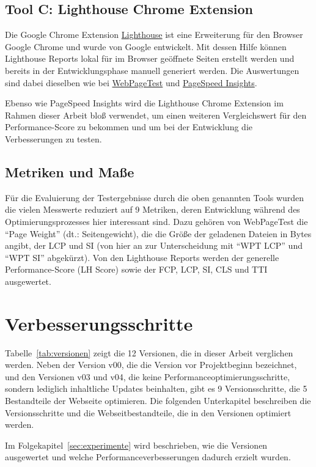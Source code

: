 \documentclass[11pt,a4paper]{article}
\begin{document}
\subsection{Tool C: Lighthouse Chrome Extension}\label{subsec:Lighthouse}
Die Google Chrome Extension \href{https://chromewebstore.google.com/detail/lighthouse/blipmdconlkpinefehnmjammfjpmpbjk}{Lighthouse} ist eine Erweiterung für den Browser Google Chrome und wurde von Google entwickelt.
Mit dessen Hilfe können Lighthouse Reports lokal für im Browser geöffnete Seiten erstellt werden und bereits in der Entwicklungsphase manuell generiert werden.
Die Auswertungen sind dabei dieselben wie bei \hyperref[subsec:WebPageTest]{WebPageTest} und \hyperref[subsec:PageSpeed]{PageSpeed Insights}.

Ebenso wie PageSpeed Insights wird die Lighthouse Chrome Extension im Rahmen dieser Arbeit bloß verwendet, um einen weiteren Vergleichswert für den Performance-Score zu bekommen und um bei der Entwicklung die Verbesserungen zu testen.

\subsection{Metriken und Maße}
Für die Evaluierung der Testergebnisse durch die oben genannten Tools wurden die vielen Messwerte reduziert auf 9 Metriken, deren Entwicklung während des Optimierungsprozesses hier interessant sind.
Dazu gehören von WebPageTest die \enquote{Page Weight} (dt.: Seitengewicht), die die Größe der geladenen Dateien in Bytes angibt, der LCP und SI (von hier an zur Unterscheidung mit \enquote{WPT LCP} und \enquote{WPT SI} abgekürzt).
Von den Lighthouse Reports werden der generelle Performance-Score (LH Score) sowie der FCP, LCP, SI, CLS und TTI ausgewertet.

\section{Verbesserungsschritte}
Tabelle~\ref{tab:versionen} zeigt die 12 Versionen, die in dieser Arbeit verglichen werden.
Neben der Version v00, die die Version vor Projektbeginn bezeichnet, und den Versionen v03 und v04, die keine Performanceoptimierungsschritte, sondern lediglich inhaltliche Updates beinhalten, gibt es 9 Versionsschritte, die 5 Bestandteile der Webseite optimieren.
Die folgenden Unterkapitel beschreiben die Versionsschritte und die Webseitbestandteile, die in den Versionen optimiert werden.

Im Folgekapitel~\ref{sec:experimente} wird beschrieben, wie die Versionen ausgewertet und welche Performanceverbesserungen dadurch erzielt wurden.
\end{document}
